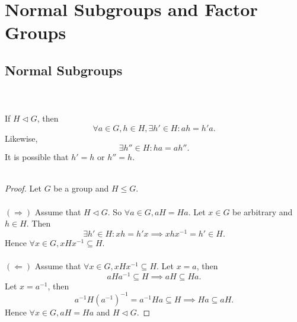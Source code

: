 \documentclass{article}
\newtheorem{theorem}{Theorem}[section]
\theoremstyle{definition}
\newtheorem{definition}{Definition}[section]
\begin{document}
     \section{Normal Subgroups and Factor Groups}
     \subsection{Normal Subgroups}
     \\ \\
     If $H \lhd G$, then 
     \begin{equation*}
         \forall a \in G, h \in H, \exists h' \in H: ah = h'a.
     \end{equation*}
     Likewise, 
     \begin{equation*}
         \exists h'' \in H: ha = ah''.
     \end{equation*}
     It is possible that $h'=h$ or $h''=h$.
     \\ \\
     
     \begin{proof}
        Let $G$ be a group and $H\leq G$. 
        \\ \\
        $(\Rightarrow)$ Assume that $H \lhd G$. So $\forall a \in G, aH = Ha$. Let $x \in G$ be arbitrary and $h \in H$. Then
        \begin{equation*}
            \exists h' \in H: xh = h'x \implies xhx^{-1} = h' \in H.
        \end{equation*}
        Hence $\forall x \in G, xHx^{-1} \subseteq H$.
        \\ \\
        $(\Leftarrow)$ Assume that $\forall x \in G, xHx^{-1} \subseteq H$. Let $x=a$, then
        \begin{equation*}
            aHa^{-1} \subseteq H \implies aH \subseteq Ha.
        \end{equation*}
        Let $x=a^{-1}$, then
        \begin{equation*}
            a^{-1}H(a^{-1})^{-1} = a^{-1}Ha \subseteq H \implies Ha \subseteq aH.
        \end{equation*}
        Hence $\forall x \in G, aH = Ha$ and $H \lhd G$.
     \end{proof}
     
\end{document}
